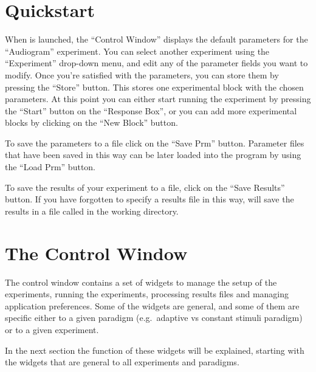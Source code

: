 \documentclass[a4paper,12pt,english]{sphinxmanual}
\begin{document}
\section{Quickstart}
\label{graphical_user_interface:quickstart}
When  is launched, the “Control Window” displays the
default parameters for the “Audiogram” experiment. You can select
another experiment using the “Experiment” drop-down menu, and edit any
of the parameter fields you want to modify. Once you’re satisfied with
the parameters, you can store them by pressing the “Store” button. This
stores one experimental block with the chosen parameters. At this point
you can either start running the experiment by pressing the “Start”
button on the “Response Box”, or you can add more experimental blocks by
clicking on the “New Block” button.

To save the parameters to a file click on the “Save Prm” button.
Parameter files that have been saved in this way can be later loaded
into the program by using the “Load Prm” button.

To save the results of your experiment to a file, click on the “Save
Results” button. If you have forgotten to specify a results file in this
way,  will save the results in a file called
 in the working directory.


\section{The Control Window}
\label{graphical_user_interface:the-control-window}
The control window contains a set of widgets to manage the setup of the
experiments, running the experiments, processing results files and
managing application preferences. Some of the widgets are general, and
some of them are specific either to a given paradigm (e.g. adaptive vs
constant stimuli paradigm) or to a given experiment.

In the next section the function of these widgets will be explained,
starting with the widgets that are general to all experiments and
paradigms.
\end{document}
